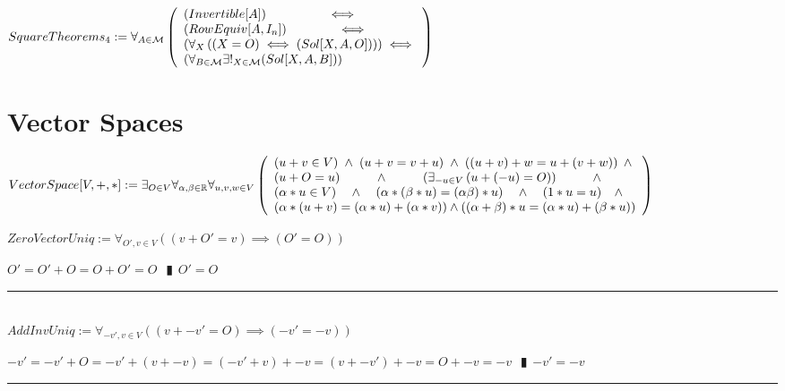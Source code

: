 \documentclass{book}
\newcommand{\abr}{:=}
\newcommand{\pipe}{$\phantom{(}\vrectangleblack\phantom{)}$}
\newcommand{\pr}[1]{\left(#1\right)}
\begin{document}
$SquareTheorems_4 \abr \forall_{A \in \mathcal{M}}\left(\begin{array}{ll}
  (Invertible[A]) \hfill \iff \hfill \\
  (RowEquiv[A, I_n]) \hfill \iff \hfill \\
  \pr{\forall_{X}\pr{(X = O) \iff (Sol[X, A, O])}} \hfill \iff \hfill \\
  \pr{\forall_{B \in \mathcal{M}} \exists!_{X \in \mathcal{M}}(Sol[X, A, B])}
\end{array}\right)$ \\


\section{Vector Spaces}
$VectorSpace[V, +, *] \abr \exists_{O \in V} \forall_{\alpha ,\beta \in \mathbb{R}} \forall_{u, v, w \in V} \left(\begin{array}{ll}
  (u + v \in V) \hfill \land \hfill (u + v = v + u) \hfill \land \hfill \pr{(u + v) + w = u + (v + w)} \hfill \land \hfill \\
  (u + O = u) \hfill \land \hfill \pr{\exists_{-u \in V}\pr{u + (-u) = O}} \hfill \land \hfill \\
  (\alpha * u \in V) \hfill \land \hfill \pr{\alpha * (\beta * u) = (\alpha \beta) * u} \hfill \land \hfill (1 * u = u) \hfill \land \hfill \\
  \pr{\alpha * (u + v) = (\alpha * u) + (\alpha * v)}  \hfill \land \hfill \pr{(\alpha + \beta) * u = (\alpha * u) + (\beta * u)} \\
\end{array}\right)$

$ZeroVectorUniq \abr \forall_{O', v \in V}\pr{(v + O' = v) \implies (O' = O)}$
\begin{enumerate}
  \lit $O' = O' + O = O + O' = O$ \pipe $O' = O$
\end{enumerate} \vspace{.75mm} \hrule \vspace{.75mm} \ \\ 

$AddInvUniq \abr \forall_{-v', v \in V}\pr{(v + -v' = O) \implies (-v' = -v)}$
\begin{enumerate}
  \lit $-v' = -v' + O = -v' + (v + -v) = (-v' + v) + -v = (v + -v') + -v = O + -v = -v$ \pipe $-v' = -v$
\end{enumerate} \vspace{.75mm} \hrule \vspace{.75mm} \ \\ 
\end{document}
